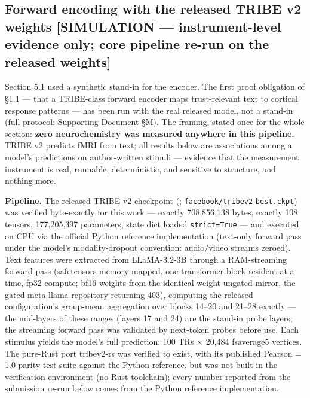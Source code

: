 \documentclass[11pt,twocolumn]{article}
\theoremstyle{plain}
\begin{document}
\subsection{Forward encoding with the released TRIBE v2 weights [SIMULATION — instrument-level evidence only; core pipeline re-run on the released weights]}

Section 5.1 used a synthetic stand-in for the encoder. The first proof obligation of \S{}1.1 — that a TRIBE-class forward encoder maps trust-relevant text to cortical response patterns — has been run with the real released model, not a stand-in (full protocol: Supporting Document \S{}M). The framing, stated once for the whole section: \textbf{zero neurochemistry was measured anywhere in this pipeline.} TRIBE v2 predicts fMRI from text; all results below are associations among a model's predictions on author-written stimuli — evidence that the measurement instrument is real, runnable, deterministic, and sensitive to structure, and nothing more.

\textbf{Pipeline.} The released TRIBE v2 checkpoint (\citealp{dascoli2026}; \texttt{facebook/tribev2} \texttt{best.ckpt}) was verified byte-exactly for this work --- exactly 708,856,138 bytes, exactly 108 tensors, 177,205,397 parameters, state dict loaded \texttt{strict=True} --- and executed on CPU via the official Python reference implementation (text-only forward pass under the model's modality-dropout convention: audio/video streams zeroed). Text features were extracted from LLaMA-3.2-3B through a RAM-streaming forward pass (safetensors memory-mapped, one transformer block resident at a time, fp32 compute; bf16 weights from the identical-weight ungated mirror, the gated meta-llama repository returning 403), computing the released configuration's group-mean aggregation over blocks 14--20 and 21--28 exactly --- the mid-layers of these ranges (layers 17 and 24) are the stand-in probe layers; the streaming forward pass was validated by next-token probes before use. Each stimulus yields the model's full prediction: 100 TRs $\times$ 20,484 fsaverage5 vertices. The pure-Rust port tribev2-rs \citep{hauptmann2026} was verified to exist, with its published Pearson = 1.0 parity test suite against the Python reference, but was not built in the verification environment (no Rust toolchain); every number reported from the submission re-run below comes from the Python reference implementation.
\end{document}

